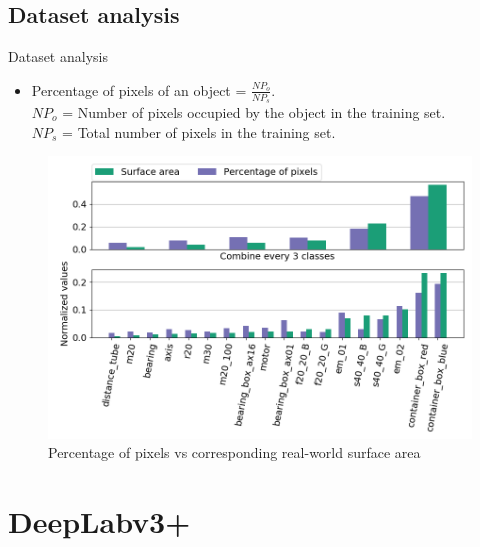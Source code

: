 \documentclass{beamer}
\begin{document}
\subsection{Dataset analysis}

\begin{frame}{Dataset analysis}
\label{slide:analysis}
	\begin{small}
	\begin{itemize}
		\item Percentage of pixels of an object = $\frac{NP_o}{NP_s}$. \\
		$NP_o$ = Number of pixels occupied by the object in the training set. \\ $NP_s$ = Total number of pixels in the training set.
	\end{itemize}
	\begin{figure}
		\centering
		\includegraphics[scale=0.35]{images/analyzer_full}
		\captionsetup{justification=centering,margin=0.2cm}
		\caption{Percentage of pixels vs corresponding real-world surface area}
		\label{Fig:surarea}
	\end{figure}
	\end{small}

\end{frame}

\section{DeepLabv3+}
\end{document}
